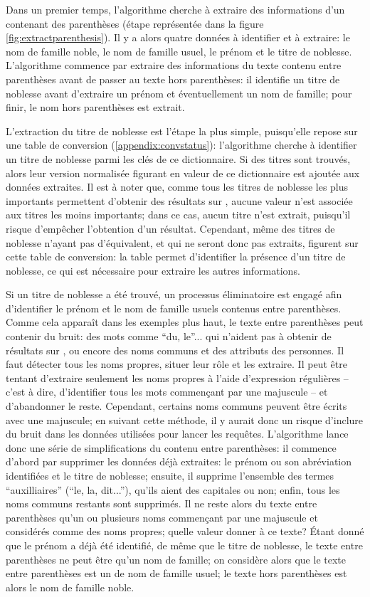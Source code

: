 Dans un premier temps, l'algorithme cherche à extraire des informations d'un \tname{} contenant des parenthèses (étape représentée dans la figure \ref{fig:extractparenthesis}). Il y a alors quatre données à identifier et à extraire: le nom de famille noble, le nom de famille usuel, le prénom et le titre de noblesse. L'algorithme commence par extraire des informations du texte contenu entre parenthèses avant de passer au texte hors parenthèses: il identifie un titre de noblesse avant d'extraire un prénom et éventuellement un nom de famille; pour finir, le nom hors parenthèses est extrait.

L'extraction du titre de noblesse est l'étape la plus simple, puisqu'elle repose sur une table de conversion (\ref{appendix:convstatus}): l'algorithme cherche à identifier un titre de noblesse parmi les clés de ce \gls{dictionnaire}. Si des titres sont trouvés, alors leur version normalisée figurant en valeur de ce dictionnaire est ajoutée aux données extraites. Il est à noter que, comme tous les titres de noblesse les plus importants permettent d'obtenir des résultats sur \wkd{}, aucune valeur n'est associée aux titres les moins importants; dans ce cas, aucun titre n'est extrait, puisqu'il risque d'empêcher l'obtention d'un résultat. Cependant, même des titres de noblesse n'ayant pas d'équivalent, et qui ne seront donc pas extraits, figurent sur cette table de conversion: la table permet d'identifier la présence d'un titre de noblesse, ce qui est nécessaire pour extraire les autres informations.

Si un titre de noblesse a été trouvé, un processus éliminatoire est engagé afin d'identifier le prénom et le nom de famille usuels contenus entre parenthèses. Comme cela apparaît dans les exemples plus haut, le texte entre parenthèses peut contenir du bruit: des mots comme \enquote{du, le}... qui n'aident pas à obtenir de résultats sur \wkd{}, ou encore des noms communs et des attributs des personnes. Il faut détecter tous les noms propres, situer leur rôle et les extraire. Il peut être tentant d'extraire seulement les noms propres à l'aide d'\glspl{expression régulière} -- c'est à dire, d'identifier tous les mots commençant par une majuscule -- et d'abandonner le reste. Cependant, certains noms communs peuvent être écrits avec une majuscule; en suivant cette méthode, il y aurait donc un risque d'inclure du bruit dans les données utilisées pour lancer les requêtes. L'algorithme lance donc une série de simplifications du contenu entre parenthèses: il commence d'abord par supprimer les données déjà extraites: le prénom ou son abréviation identifiées et le titre de noblesse; ensuite, il supprime l'ensemble des termes \enquote{auxilliaires} (\enquote{le, la, dit...}), qu'ils aient des capitales ou non; enfin, tous les noms communs restants sont supprimés. Il ne reste alors du texte entre parenthèses qu'un ou plusieurs noms commençant par une majuscule et considérés comme des noms propres; quelle valeur donner à ce texte? Étant donné que le prénom a déjà été identifié, de même que le titre de noblesse, le texte entre parenthèses ne peut être qu'un nom de famille; on considère alors que le texte entre parenthèses est un de nom de famille usuel; le texte hors parenthèses est alors le nom de famille noble.

